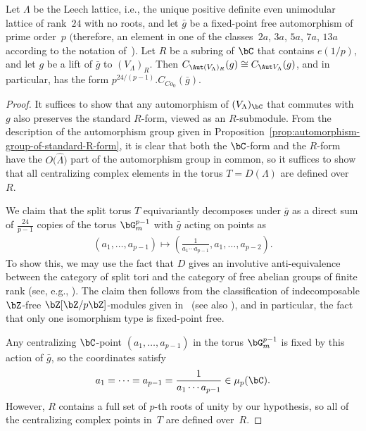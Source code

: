 \begin{prop} \label{prop:centralizers-for-Leech}
Let $\Lambda$ be the Leech lattice, i.e., the unique positive definite even uni\-mo\-dular lattice of rank~$24$ with no roots, and let $\bar{g}$ be a fixed-point free automorphism of prime order~$p$ $($therefore, an element in one of the classes~$2a$, $3a$, $5a$, $7a$, $13a$ according to the notation of~{\rm \cite{GAP})}. Let $R$ be a subring of $\bC$ that contains $e(1/p)$, and let $g$ be a lift of $\bar{g}$ to $(V_\Lambda)_R$. Then $C_{\Aut (V_\Lambda)_R}(g) \cong C_{\Aut V_\Lambda}(g)$, and in particular, has the form $p^{24/(p-1)}.C_{Co_0}(\bar{g})$.
\end{prop}
\begin{proof}It suffices to show that any automorphism of $(V_\Lambda)_\bC$ that commutes with $g$ also preserves the standard $R$-form, viewed as an $R$-submodule. From the description of the automorphism group given in Proposition~\ref{prop:automorphism-group-of-standard-R-form}, it is clear that both the $\bC$-form and the $R$-form have the $O\big(\hat{\Lambda}\big)$ part of the automorphism group in common, so it suffices to show that all centralizing complex elements in the torus $T = D(\Lambda)$ are defined over~$R$.

We claim that the split torus $T$ equivariantly decomposes under $\bar{g}$ as a direct sum of $\frac{24}{p-1}$ copies of the torus $\bG_m^{p-1}$ with $\bar{g}$ acting on points as
\begin{gather*} (a_1, \ldots ,a_{p-1}) \mapsto \left(\frac{1}{a_1\cdots a_{p-1}},a_1,\ldots,a_{p-2}\right). \end{gather*}
To show this, we may use the fact that $D$ gives an involutive anti-equivalence between the category of split tori and the category of free abelian groups of finite rank (see, e.g., \cite[Expos\'e~VIII, Section~1]{SGA3}). The claim then follows from the classification of indecomposable $\bZ$-free $\bZ[\bZ/p\bZ]$-modules given in~\cite{D38} (see also \cite[Theorem~74.3]{CR62}), and in particular, the fact that only one isomorphism type is fixed-point free.

Any centralizing $\bC$-point $(a_1, \ldots, a_{p-1})$ in the torus $\bG_m^{p-1}$ is fixed by this action of $\bar{g}$, so the coordinates satisfy
\begin{gather*} a_1=\cdots = a_{p-1} = \frac{1}{a_1\cdots a_{p-1}} \in \mu_p(\bC). \end{gather*}
However, $R$ contains a full set of $p$-th roots of unity by our hypothesis, so all of the centralizing complex points in~$T$ are defined over~$R$.
\end{proof}

